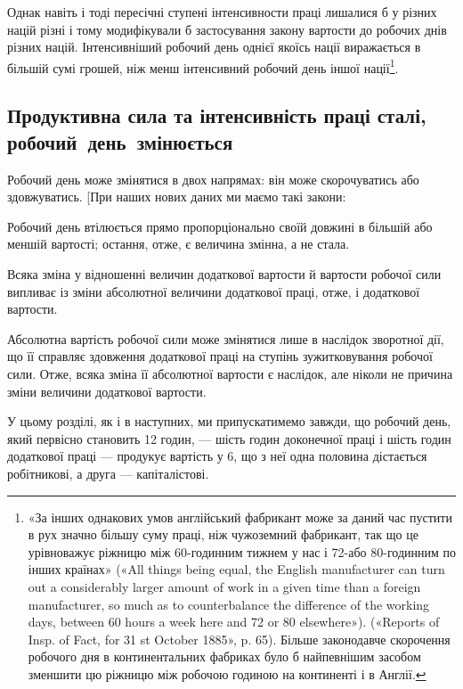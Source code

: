 \parcont{}  %
Однак навіть і тоді пересічні ступені інтенсивности праці лишалися
б у різних націй різні і тому модифікували б застосування
закону вартости до робочих днів різних націй. Інтенсивніший
робочий день однієї якоїсь нації виражається в більшій сумі
грошей, ніж менш інтенсивний робочий день іншої нації\footnote{
«За інших однакових умов англійський фабрикант може за даний
час пустити в рух значно більшу суму праці, ніж чужоземний фабрикант,
так що це урівноважує ріжницю між 60-годинним тижнем у нас
і 72-або 80-годинним по інших країнах» («All things being equal,
the English manufacturer can turn out a considerably larger amount of
work in a given time than a foreign manufacturer, so much as to counterbalance
the difference of the working days, between 60 hours a week here
and 72 or 80 elsewhere»). («Reports of Insp. of Fact, for 31 st October 1885»,
p. 65). Більше законодавче скорочення робочого дня в континентальних
фабриках було б найпевнішим засобом зменшити цю ріжницю між робочою
годиною на континенті і в Англії.
}.

\vspace{-\medskipamount}
\subsection{Продуктивна сила та інтенсивність праці сталі,
робочий~день~змінюється}
\vspace{-\medskipamount}

Робочий день може змінятися в двох напрямах: він може
скорочуватись або здовжуватись. [При наших нових даних ми
маємо такі закони:

Робочий день втілюється прямо пропорціонально своїй довжині
в більшій або меншій вартості; остання, отже, є величина
змінна, а не стала.

Всяка зміна у відношенні величин додаткової вартости й вартости
робочої сили випливає із зміни абсолютної величини додаткової
праці, отже, і додаткової вартости.

Абсолютна вартість робочої сили може змінятися лише в
наслідок зворотної дії, що її справляє здовження додаткової
праці на ступінь зужитковування робочої сили. Отже, всяка зміна
її абсолютної вартости є наслідок, але ніколи не причина зміни
величини додаткової вартости.

У цьому розділі, як і в наступних, ми припускатимемо завжди,
що робочий день, який первісно становить 12 годин, — шість
годин доконечної праці і шість годин додаткової праці — продукує
вартість у 6, що з неї одна половина дістається
робітникові, а друга — капіталістові.

